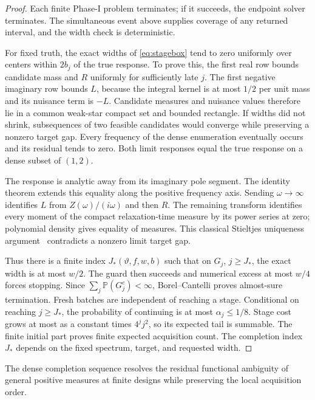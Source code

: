 \documentclass[10pt]{amsart}
\theoremstyle{definition}
\theoremstyle{remark}
\newcommand{\Prob}{\mathbb P}
\begin{document}
\begin{proof}
Each finite Phase-I problem terminates; if it succeeds, the endpoint solver terminates. The simultaneous event above supplies coverage of any returned interval, and the width check is deterministic.

For fixed truth, the exact widths of \eqref{eq:stagebox} tend to zero uniformly over centers within $2b_j$ of the true response. To prove this, the first real row bounds candidate mass and $R$ uniformly for sufficiently late $j$. The first negative imaginary row bounds $L$, because the integral kernel is at most $1/2$ per unit mass and its nuisance term is $-L$. Candidate measures and nuisance values therefore lie in a common weak-star compact set and bounded rectangle. If widths did not shrink, subsequences of two feasible candidates would converge while preserving a nonzero target gap. Every frequency of the dense enumeration eventually occurs and its residual tends to zero. Both limit responses equal the true response on a dense subset of $(1,2)$.

The response is analytic away from its imaginary pole segment. The identity theorem extends this equality along the positive frequency axis. Sending $\omega\to\infty$ identifies $L$ from $Z(\omega)/(i\omega)$ and then $R$. The remaining transform identifies every moment of the compact relaxation-time measure by its power series at zero; polynomial density gives equality of measures. This classical Stieltjes uniqueness argument~\cite{grabovsky} contradicts a nonzero limit target gap.

Thus there is a finite index $J_*(\vartheta,f,w,b)$ such that on $G_j$, $j\ge J_*$, the exact width is at most $w/2$. The guard then succeeds and numerical excess at most $w/4$ forces stopping. Since $\sum_j\Prob(G_j^c)<\infty$, Borel--Cantelli proves almost-sure termination. Fresh batches are independent of reaching a stage. Conditional on reaching $j\ge J_*$, the probability of continuing is at most $\alpha_j\le1/8$. Stage cost grows at most as a constant times $4^jj^2$, so its expected tail is summable. The finite initial part proves finite expected acquisition count. The completion index $J_*$ depends on the fixed spectrum, target, and requested width.
\end{proof}

The dense completion sequence resolves the residual functional ambiguity of general positive measures at finite designs while preserving the local acquisition order.
\end{document}
